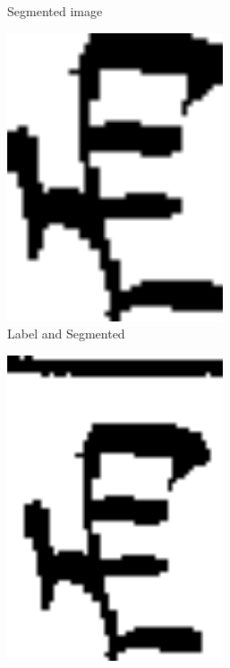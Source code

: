 \begin{figure}[ht]
\begin{subfigure}{0.24\textwidth}
    \caption{Segmented image}
    \label{fig:experiment:found}
  \end{subfigure}
    \begin{subfigure}{0.24\textwidth}
    \centering
    \includegraphics[width=0.7\textwidth]{./images/experiment/and.png}
    \caption{Label and Segmented}
    \label{fig:experiment:and}
  \end{subfigure}
  \begin{subfigure}{0.24\textwidth}
    \centering
    \includegraphics[width=0.7\textwidth]{./images/experiment/or.png}

\end{subfigure}
\end{figure}
